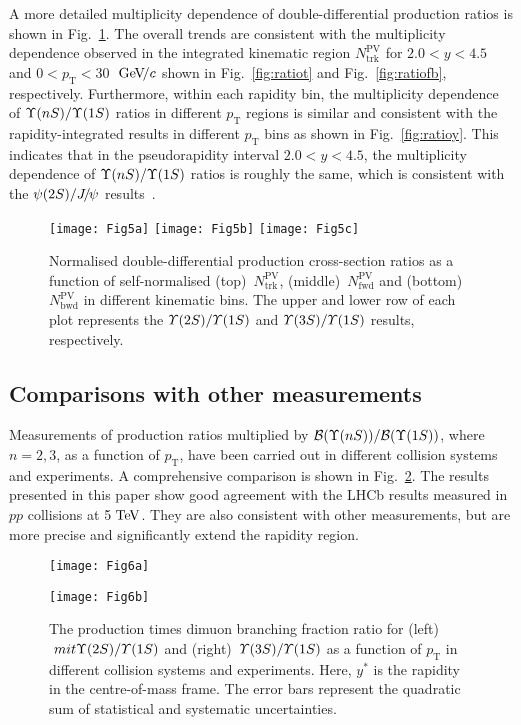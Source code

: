 \documentclass[12pt,a4paper]{article}
\def\pvt{N_{\mathrm{trk}}^{\mathrm{PV}}}
\def\Ppsi        {\ensuremath{\uppsi}\xspace}
\def\PJ      {\ensuremath{\mathrm{J}}\xspace}
\def\Ppsi        {\ensuremath{\psi}\xspace}
\def\PJ      {\ensuremath{J}\xspace}
\def\jpsi     {{\ensuremath{{\PJ\mskip -3mu/\mskip -2mu\Ppsi}}}\xspace}
\def\BF         {{\ensuremath{\mathcal{B}}}\xspace}
\def\BR         {\BF}
\newcommand{\aunit}[1]{\ensuremath{\text{\,#1}}}
\newcommand{\tev}{\aunit{Te\kern -0.1em V}\xspace}
\newcommand{\gevc}{\ensuremath{\aunit{Ge\kern -0.1em V\!/}c}\xspace}
\def\pt         {\ensuremath{p_{\mathrm{T}}}\xspace}
\begin{document}
A more detailed multiplicity dependence of double-differential production ratios is shown in Fig.~\ref{fig:ratiopvt}. 
The overall trends are consistent with the multiplicity dependence observed in the integrated kinematic region $\pvt$ for \mbox{$2.0<y<4.5$} and \mbox{$0<\pt<30$ \gevc} shown in Fig.~\ref{fig:ratiot} and Fig.~\ref{fig:ratiofb}, respectively.  
Furthermore, within each rapidity bin, the multiplicity dependence of $\Upsilon{(nS)}/\Upsilon{(1S)}$ ratios in different \pt regions is similar and consistent with the rapidity-integrated results in different \pt bins as shown in Fig.~\ref{fig:ratioy}. 
This indicates that in the pseudorapidity interval $2.0<y<4.5$, the multiplicity dependence of $\Upsilon{(nS)}/\Upsilon{(1S)}$ ratios is roughly the same, which is consistent with the $\psi(2S)/\jpsi$ results~\cite{LHCb:2023xie}.
\begin{figure}[!tbp]
\centering
\texttt{[image: Fig5a]}
\texttt{[image: Fig5b]}
\texttt{[image: Fig5c]}
\caption{Normalised double-differential production cross-section ratios as a function of self-normalised (top)~$N_{\mathrm{trk}}^{\mathrm{PV}}$, (middle)~$N_{\mathrm{fwd}}^{\mathrm{PV}}$ and (bottom)~$N_{\mathrm{bwd}}^{\mathrm{PV}}$ in different kinematic bins. The upper and lower row of each plot represents the $\mit\Upsilon(\mathrm{2}S)/\mit\Upsilon(\mathrm{1}S)$ and $\mit\Upsilon(\mathrm{3}S)/\mit\Upsilon(\mathrm{1}S)$ 
results, respectively.} 
\label{fig:ratiopvt}
\end{figure}

\clearpage
\subsection{Comparisons with other measurements}
Measurements of production ratios multiplied by $\BR(\Yn{n})/\BR(\Yn{1})$, where $n=2,3$, as a function of \pt, have been carried out in different collision systems and experiments\cite{LHCb:2018psc,LHCb:2022byt,CMS:2015xqv}. A comprehensive comparison is shown in Fig.~\ref{fig:compt}. The results presented in this paper show good agreement with the LHCb results measured in $pp$ collisions at 5\,\tev. They are also consistent with other measurements, but are more precise and significantly extend the rapidity region.
\begin{figure}[!tb]
\centering
\begin{minipage}[t]{0.49\textwidth}
\centering
\texttt{[image: Fig6a]}
\end{minipage}
\begin{minipage}[t]{0.49\textwidth}
\centering
\texttt{[image: Fig6b]}
\end{minipage}
\caption{The production times dimuon branching fraction ratio for (left)~$\
mit\Upsilon(\mathrm{2}S)/\mit\Upsilon(\mathrm{1}S)$ and (right)~$\mit\Upsilon(\mathrm{3}S)/\mit\Upsilon(\mathrm{1}S)$ as a function of $\pt$ in different collision systems and experiments\cite{LHCb:2018psc,LHCb:2022byt,CMS:2015xqv}. Here, $y^*$ is the rapidity in the centre-of-mass frame. The error bars represent the quadratic sum of statistical and systematic uncertainties.} 
\label{fig:compt}
\end{figure}
\end{document}

